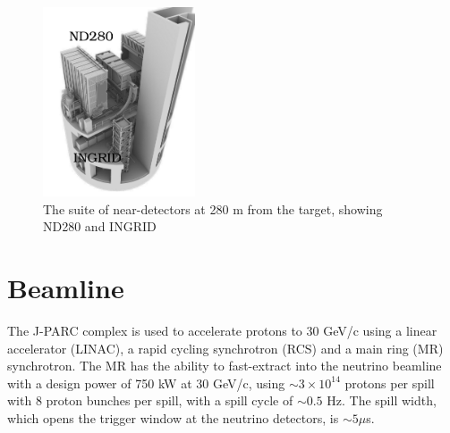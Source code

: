 \begin{figure}[h]
	\includegraphics[width=0.4\textwidth, trim={10mm 0mm 0mm 0mm}, clip,page=1]{figures/det_chap/view/image_nd.jpeg}
	\caption{The suite of near-detectors at 280 m from the target, showing ND280 and INGRID}
\end{figure}

\section{Beamline}
The J-PARC complex\cite{jparc_tdr} is used to accelerate protons to 30 GeV/c using a linear accelerator (LINAC), a rapid cycling synchrotron (RCS) and a main ring (MR) synchrotron. The MR has the ability to fast-extract into the neutrino beamline with a design power of 750 kW at 30 GeV/c, using $\sim3\times10^{14}$ protons per spill with 8 proton bunches per spill, with a spill cycle of $\sim0.5$ Hz. The spill width, which opens the trigger window at the neutrino detectors, is $\sim5 \mu$s\cite{t2k_det}.

